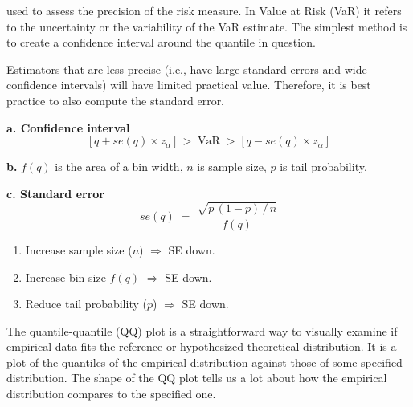 
 used to assess the precision of the risk measure. In Value at Risk (VaR)
it refers to the uncertainty or the variability of the VaR estimate. The simplest method is to
create a confidence interval around the quantile in question.

Estimators that are less precise (i.e., have large standard errors and wide confidence
intervals) will have limited practical value. Therefore, it is best practice to also compute
the standard error.

\begin{mrfmlbox}[breakable=false]
\textbf{a. Confidence interval}
\[ \bigl[\, q + se(q) \times z_\alpha \,\bigr] \;>\; \mathrm{VaR} \;>\;
   \bigl[\, q - se(q) \times z_\alpha \,\bigr] \]

\medskip
\textbf{b.} $f(q)$ is the area of a bin width, $n$ is sample size, $p$ is tail probability.

\medskip
\textbf{c. Standard error}
\[ se(q) \;=\; \frac{\sqrt{p\,(1-p)\,/\,n}}{f(q)} \]
\end{mrfmlbox}

\begin{mrkeybox}[title={How to reduce standard errors}]
\begin{enumerate}
\item Increase sample size ($n$) $\Rightarrow$ SE down.
\item Increase bin size $f(q)$ $\Rightarrow$ SE down.
\item Reduce tail probability ($p$) $\Rightarrow$ SE down.
\end{enumerate}
\end{mrkeybox}


 The quantile-quantile (QQ) plot is a straightforward way to
visually examine if empirical data fits the reference or hypothesized theoretical distribution.
It is a plot of the quantiles of the empirical distribution against those of some specified
distribution. The shape of the QQ plot tells us a lot about how the empirical distribution
compares to the specified one.

